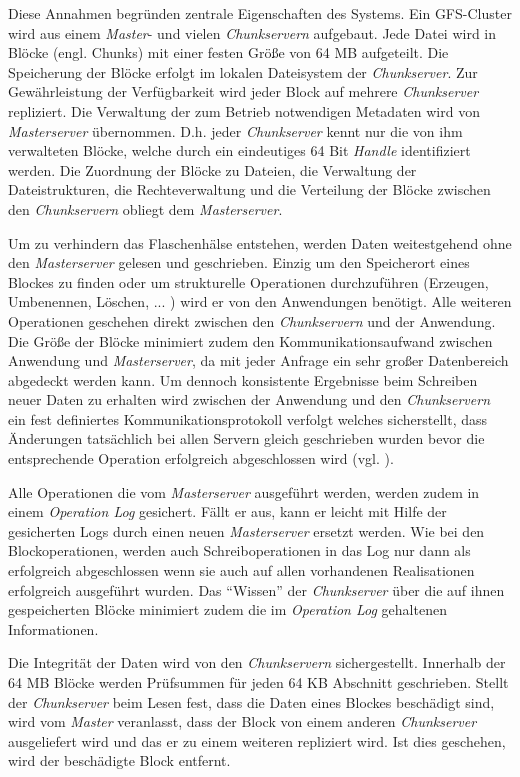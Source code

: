 Diese Annahmen begründen zentrale Eigenschaften des Systems. Ein \acs{GFS}-Cluster wird aus einem \textit{Master}- und vielen \textit{Chunkservern} aufgebaut. Jede Datei wird in Blöcke (engl. Chunks) mit einer festen Größe von 64 MB aufgeteilt. Die Speicherung der Blöcke erfolgt im lokalen Dateisystem der \textit{Chunkserver}. Zur Gewährleistung der Verfügbarkeit wird jeder Block auf mehrere \textit{Chunkserver} repliziert. Die Verwaltung der zum Betrieb notwendigen Metadaten wird von \textit{Masterserver} übernommen. D.h. jeder \textit{Chunkserver} kennt nur die von ihm verwalteten Blöcke, welche durch ein eindeutiges 64 Bit \textit{Handle} identifiziert werden. Die Zuordnung der Blöcke zu Dateien, die Verwaltung der Dateistrukturen, die Rechteverwaltung und die Verteilung der Blöcke zwischen den \textit{Chunkservern} obliegt dem \textit{Masterserver}.

Um zu verhindern das Flaschenhälse entstehen, werden Daten weitestgehend ohne den \textit{Masterserver} gelesen und geschrieben. Einzig um den Speicherort eines Blockes zu finden oder um strukturelle Operationen durchzuführen (Erzeugen, Umbenennen, Löschen, ... ) wird er von den Anwendungen benötigt. Alle weiteren Operationen geschehen direkt zwischen den \textit{Chunkservern} und der Anwendung. Die Größe der Blöcke minimiert zudem den Kommunikationsaufwand zwischen Anwendung und \textit{Masterserver}, da mit jeder Anfrage ein sehr großer Datenbereich abgedeckt werden kann. Um dennoch konsistente Ergebnisse beim Schreiben neuer Daten zu erhalten wird zwischen der Anwendung und den \textit{Chunkservern} ein fest definiertes Kommunikationsprotokoll verfolgt welches sicherstellt, dass Änderungen tatsächlich bei allen Servern gleich geschrieben wurden bevor die entsprechende Operation erfolgreich abgeschlossen wird (vgl. \citep[Kap. 3]{ghemawat03}).

Alle Operationen die vom \textit{Masterserver} ausgeführt werden, werden zudem in einem \textit{Operation Log} gesichert. Fällt er aus, kann er leicht mit Hilfe der gesicherten Logs  durch einen neuen \textit{Masterserver} ersetzt werden. Wie bei den Blockoperationen, werden auch Schreiboperationen in das Log nur dann als erfolgreich abgeschlossen wenn sie auch auf allen vorhandenen Realisationen erfolgreich ausgeführt wurden. Das ``Wissen'' der \textit{Chunkserver} über die auf ihnen gespeicherten Blöcke minimiert zudem die im \textit{Operation Log} gehaltenen Informationen.

Die Integrität der Daten wird von den \textit{Chunkservern} sichergestellt. Innerhalb der 64 MB Blöcke werden Prüfsummen für jeden 64 KB Abschnitt geschrieben. Stellt der \textit{Chunkserver} beim Lesen fest, dass die Daten eines Blockes beschädigt sind, wird vom \textit{Master} veranlasst, dass der Block von einem anderen \textit{Chunkserver} ausgeliefert wird und das er zu einem weiteren repliziert wird. Ist dies geschehen, wird der beschädigte Block entfernt.

